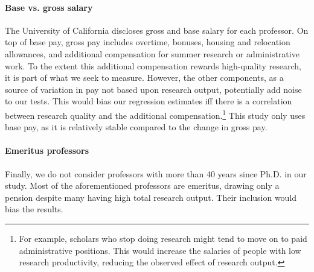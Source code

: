 \paragraph{Base vs. gross salary}
The University of California discloses gross and base salary for each professor. On top of base pay, gross pay includes overtime, bonuses, housing and relocation allowances, and additional compensation for summer research or administrative work. To the extent this additional compensation rewards high-quality research, it is part of what we seek to measure. However, the other components, as a source of variation in pay not based upon research output, potentially add noise to our tests. This would bias our regression estimates iff there is a correlation between research quality and the additional compensation.\footnote{For example, scholars who stop doing research might tend to move on to paid administrative positions. This would increase the salaries of people with low research productivity, reducing the observed effect of research output.} This study only uses base pay, as it is relatively stable compared to the change in gross pay.

\paragraph{Emeritus professors}
Finally, we do not consider professors with more than 40 years since Ph.D. in our study. Most of the aforementioned professors are emeritus, drawing only a pension despite many having high total research output. Their inclusion would bias the results.
